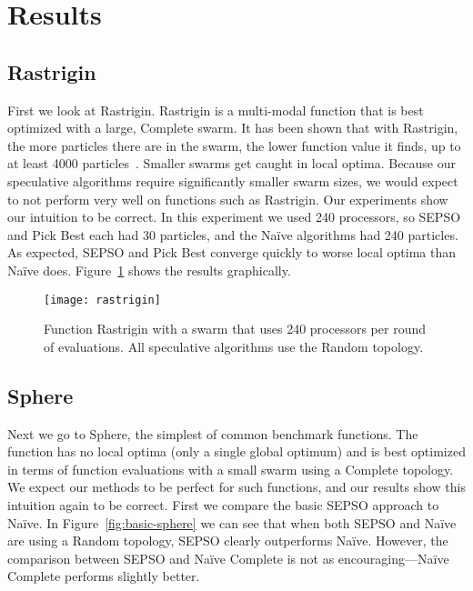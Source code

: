 \documentclass[smallcondensed]{svjour3}
\newcommand{\fig}[1]{Figure~\ref{fig:#1}}
\begin{document}
\section{Results}
\label{sec:results}

\subsection{Rastrigin}

First we look at Rastrigin.  Rastrigin is a multi-modal function that is best
optimized with a large, Complete swarm.  It has been shown that with Rastrigin,
the more particles there are in the swarm, the lower function value it finds,
up to at least 4000 particles~\citep{mcnabb-2009-large-particle-swarms}.
Smaller swarms get caught in local optima.  Because our speculative algorithms
require significantly smaller swarm sizes, we would expect to not perform very
well on functions such as Rastrigin.  Our experiments show our intuition to be
correct.  In this experiment we used 240 processors, so SEPSO and Pick Best
each had 30 particles, and the Na\"ive algorithms had 240 particles.  As
expected, SEPSO and Pick Best converge quickly to worse local optima than
Na\"ive does.  \fig{rastrigin} shows the results graphically.

\begin{figure}
  \centering
  \texttt{[image: rastrigin]}
  \caption{Function Rastrigin with a swarm that uses 240 processors per round
  of evaluations.  All speculative algorithms use the Random topology.}
  \label{fig:rastrigin}
\end{figure}

\subsection{Sphere}

Next we go to Sphere, the simplest of common benchmark functions.  The function
has no local optima (only a single global optimum) and is best optimized in
terms of function evaluations with a small swarm using a Complete topology.  We
expect our methods to be perfect for such functions, and our results show this
intuition again to be correct.  First we compare the basic SEPSO approach to
Na\"ive.  In \fig{basic-sphere} we can see that when both SEPSO and Na\"ive are
using a Random topology, SEPSO clearly outperforms Na\"ive.  However, the
comparison between SEPSO and Na\"ive Complete is not as encouraging---Na\"ive
Complete performs slightly better.
\end{document}
